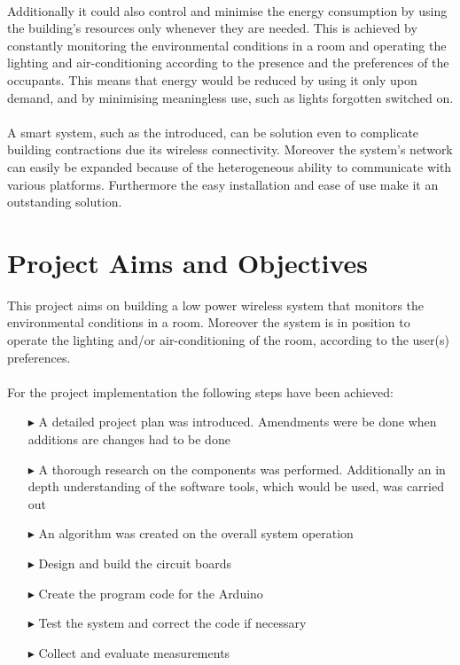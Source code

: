 \documentclass[12pt,a4paper]{report}
\begin{document}
\ \\   
Additionally it could also control and minimise the energy consumption by using the building's resources only whenever they are needed. This is achieved by constantly monitoring the environmental conditions in a room and operating the lighting and air-conditioning according to the presence and the preferences of the occupants. This means that energy would be reduced by using it only upon demand, and by minimising meaningless use, such as lights forgotten switched on.\\
\ \\
A smart system, such as the introduced, can be solution even to complicate building contractions due its wireless connectivity. Moreover the system's network can easily be expanded because of the heterogeneous ability to communicate with various platforms. Furthermore the easy installation and ease of use make it an outstanding solution.
%
\section{Project Aims and Objectives}
This project aims on building a low power wireless system that monitors the environmental conditions in a room. Moreover the system is in position to operate the lighting and/or air-conditioning of the room, according to the user(s) preferences. \\
\ \\
For the project implementation the following steps have been achieved:
\begin{itemize}
\item[$\blacktriangleright$] A detailed project plan was introduced. Amendments were be done when additions are changes had to be done
\item[$\blacktriangleright$] A thorough research on the components was performed. Additionally an in depth understanding of the software tools, which would be used, was carried out
\item[$\blacktriangleright$] An algorithm was created on the overall system operation
\item[$\blacktriangleright$] Design and build the circuit boards 
\item[$\blacktriangleright$] Create the program code for the Arduino
\item[$\blacktriangleright$] Test the system and correct the code if necessary
\item[$\blacktriangleright$] Collect and evaluate measurements
\end{itemize}
%
\newpage
\end{document}
